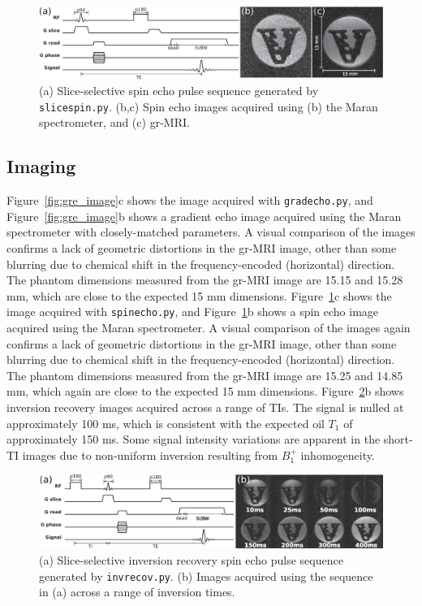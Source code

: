 \documentclass[review]{elsarticle}
\begin{document}
\begin{figure}[h]
\begin{center}
\includegraphics[width = 1\textwidth,trim=0 0 0 0,clip=false]{Fig10_fromChris/Fig10.eps}%
\caption{(a) Slice-selective spin echo pulse sequence generated by \texttt{slicespin.py}.
(b,c) Spin echo images acquired using (b) the Maran spectrometer, 
and (c) gr-MRI.} 
\label{fig:se_image}
\end{center}
\end{figure}
 
\subsection{Imaging} Figure~\ref{fig:gre_image}c shows the image acquired with \texttt{gradecho.py},
and Figure~\ref{fig:gre_image}b shows a gradient echo image acquired using the Maran spectrometer with closely-matched parameters.
A visual comparison of the images confirms a lack of geometric distortions in the gr-MRI image,
other than some blurring due to chemical shift in the frequency-encoded (horizontal) direction. 
The phantom dimensions measured from the gr-MRI image are 15.15 and 15.28 mm, 
which are close to the expected 15 mm dimensions.
Figure~\ref{fig:se_image}c shows the image acquired with \texttt{spinecho.py}, and
Figure~\ref{fig:se_image}b shows a spin echo image acquired using the Maran spectrometer.
A visual comparison of the images again confirms a lack of geometric distortions in the gr-MRI image,
other than some blurring due to chemical shift in the frequency-encoded (horizontal) direction.
The phantom dimensions measured from the gr-MRI image are 15.25 and 14.85 mm, 
which again are close to the expected 15 mm dimensions.
Figure~\ref{fig:ir_image}b shows inversion recovery images acquired across a range of TIs.  
The signal is nulled at approximately 100 ms, 
which is consistent with the expected oil $T_1$ of approximately 150 ms.
Some signal intensity variations are apparent in the short-TI images due to non-uniform inversion resulting
from $B_1^+$ inhomogeneity.

\begin{figure}[h]
\begin{center}
\includegraphics[width = 1\textwidth,trim=0 0 0 0,clip=false]{Fig11_fromChris/Fig11.eps}%
\caption{{(a) Slice-selective inversion recovery spin echo pulse sequence generated by \texttt{invrecov.py}. 
(b) Images acquired using the sequence in (a) across a range of inversion times.}}
\label{fig:ir_image}
\end{center}
\end{figure}
\end{document}
